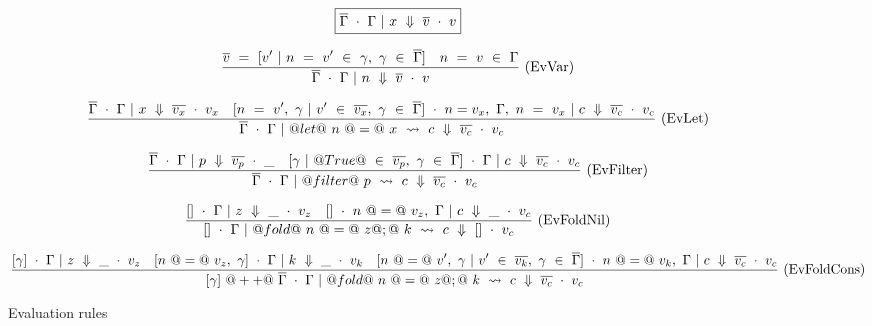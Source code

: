 
\begin{figure*}

$$
\boxed{\overline{\Gamma} ~\cdot~ \Gamma ~|~ x ~\Downarrow~ \overline{v} ~\cdot~ v}
$$


$$
\frac {\displaystyle 
    \overline{v} ~=~ [ v' ~|~ n ~=~ v' ~\in~ \gamma,~ \gamma ~\in~ \overline{\Gamma} ]
    \quad
    n ~=~ v ~\in~ \Gamma
} {\displaystyle  
    \overline{\Gamma} ~\cdot~ \Gamma ~|~ n ~\Downarrow~ \overline{v} ~\cdot~ v
} \ 
\textrm{(EvVar)}
$$

$$
\frac {\displaystyle 
    \overline{\Gamma} ~\cdot~ \Gamma ~|~ x ~\Downarrow~ \overline{v_x} ~\cdot~ v_x
    \quad
    [ n~=~v',~\gamma ~|~ v' ~\in~ \overline{v_x},~\gamma ~\in~ \overline{\Gamma}] ~\cdot~ n=v_x,~\Gamma,~n~=~v_x ~|~ c ~\Downarrow~ \overline{v_c} ~\cdot~ v_c
} {\displaystyle 
    \overline{\Gamma} ~\cdot~ \Gamma ~|~ @let@~n~@=@~x~\leadsto~c ~\Downarrow~ \overline{v_c} ~\cdot~ v_c
} \ 
\textrm{(EvLet)}
$$

$$
\frac {\displaystyle 
    \overline{\Gamma} ~\cdot~ \Gamma ~|~ p ~\Downarrow~ \overline{v_p} ~\cdot~ \_
    \quad
    [\gamma ~|~ @True@ ~\in~ \overline{v_p},~ \gamma ~\in~ \overline{\Gamma} ] ~\cdot~ \Gamma ~|~ c ~\Downarrow~ \overline{v_c} ~\cdot~ v_c
} {\displaystyle 
    \overline{\Gamma} ~\cdot~ \Gamma ~|~ @filter@~p~\leadsto~c ~\Downarrow~ \overline{v_c} ~\cdot~ v_c
} \ 
\textrm{(EvFilter)}
$$

$$
\frac {\displaystyle 
    [] ~\cdot~ \Gamma ~|~ z ~\Downarrow~ \_ ~\cdot~ v_z
    \quad
    [] ~\cdot~ n~@=@~v_z,~\Gamma ~|~ c ~\Downarrow~ \_ ~\cdot~ v_c
} {\displaystyle 
    [] ~\cdot~ \Gamma ~|~ @fold@~n~@=@~z@;@~k~\leadsto~c ~\Downarrow~ [] ~\cdot~ v_c
} \ 
\textrm{(EvFoldNil)}
$$

$$
\frac {\displaystyle 
    [\gamma] ~\cdot~ \Gamma ~|~ z ~\Downarrow~ \_ ~\cdot~ v_z
    \quad
    [n~@=@~v_z,~\gamma] ~\cdot~ \Gamma ~|~ k ~\Downarrow~ \_ ~\cdot~ v_k
    \quad
    [n~@=@~v',~\gamma ~|~ v' ~\in~ \overline{v_k},~ \gamma ~\in~ \overline{\Gamma} ] ~\cdot~ n~@=@~v_k,~\Gamma ~|~ c ~\Downarrow~ \overline{v_c} ~\cdot~ v_c
} {\displaystyle 
    [\gamma] ~@++@~ \overline{\Gamma} ~\cdot~ \Gamma ~|~ @fold@~n~@=@~z@;@~k~\leadsto~c ~\Downarrow~ \overline{v_c} ~\cdot~ v_c
} \ 
\textrm{(EvFoldCons)}
$$

\caption{Evaluation rules}
\label{fig:source:eval}
\end{figure*}


